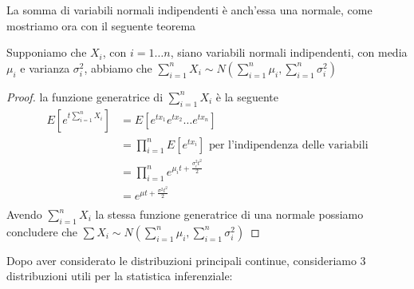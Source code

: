\documentclass[a4paper,12pt, oneside]{book}
\begin{document}
La somma di variabili normali indipendenti è anch'essa una normale, come mostriamo ora con il seguente teorema
\begin{teo}
    Supponiamo che $X_i$, con $i = 1 \dots n$, siano variabili normali indipendenti, con media $\mu_i$ e varianza $\sigma_i^2$,
    abbiamo che $\sum _{i = 1}^n X_i \sim N(\sum _{i = 1}^n \mu_i, \sum _{i = 1}^n \sigma_i^2)$
\end{teo}
\begin{proof}
    la funzione generatrice di $\sum _{i = 1} ^ n X_i$ è la seguente
    \[ \begin{split}
        E[e^{t \sum_{i = 1}^n X_i}] & = E[e^{tx_1} e^{tx_2} \dots e^{tx_n}] \\
                                    & = \prod _{i = 1}^n E[e^{tx_i}] \mbox{ per l'indipendenza delle variabili}\\
                                    & = \prod _{i = 1}^n e^{\mu_i t + \frac{\sigma_i^2 t^2}{2}} \\
                                    & = e^{\mu t + \frac{\sigma^2 t^2}{2}}\\
       \end{split} \]
    Avendo $\sum _{i = 1}^n X_i$ la stessa funzione generatrice di una normale possiamo concludere che 
    $\sum X_i \sim N(\sum _{i = 1}^n \mu_i, \sum _{i = 1}^n \sigma_i^2)$
\end{proof}
Dopo aver considerato le distribuzioni principali continue, consideriamo 3 distribuzioni utili per la statistica inferenziale:
\end{document}
